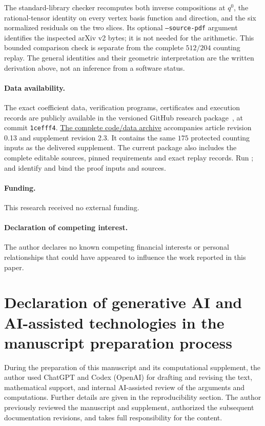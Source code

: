 \documentclass[11pt,a4paper]{article}
\theoremstyle{remark}\newtheorem{remark}[theorem]{Remark}
\begin{document}
The standard-library checker
recomputes both inverse compositions at $q^0$, the rational-tensor
identity on every vertex basis function and direction, and the six
normalized residuals on the two slices. Its optional
\texttt{--source-pdf} argument identifies the inspected arXiv v2 bytes;
it is not needed for the arithmetic. This bounded comparison check
is separate from the complete $512/204$ counting replay. The general
identities and their geometric interpretation are the written
derivation above, not an inference from a software status.


\paragraph{Data availability.}
The exact coefficient data, verification programs, certificates and
execution records are publicly available in the versioned GitHub research
package~\cite{qlc-data}, at commit \texttt{1cefff4}.
\href{https://github.com/Torsheim/quantum-gravity-qlc/blob/1cefff4a809dae7626169fad6f469b97babf8a95/Quantum_Gravity_QLC_Computational_Supplement.zip}{The complete code/data archive}
accompanies article revision 0.13 and supplement revision 2.3.
It contains the same $175$ protected counting inputs as the delivered
supplement. The current package also includes the complete editable
sources, pinned requirements and exact replay records.
Run ;  and
 identify and bind the proof inputs and sources.

\paragraph{Funding.}
This research received no external funding.

\paragraph{Declaration of competing interest.}
The author declares no known competing financial interests or personal
relationships that could have appeared to influence the work reported in
this paper.

\section*{Declaration of generative AI and AI-assisted technologies
in the manuscript preparation process}
During the preparation of this manuscript and its computational supplement,
the author used ChatGPT and Codex (OpenAI) for drafting and revising the
text, mathematical support, and internal AI-assisted review of the arguments
and computations. Further details are given in the reproducibility section.
The author previously reviewed the manuscript and supplement, authorized
the subsequent documentation revisions, and takes full responsibility for
the content.
\end{document}
